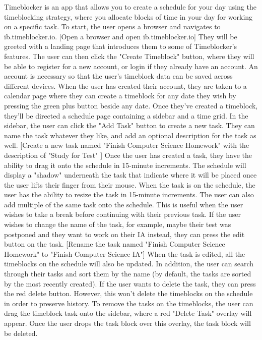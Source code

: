 \documentclass[notitlepage]{report}
\begin{document}
\obeylines
Timeblocker is an app that allows you to create a schedule for your day using the timeblocking strategy, where you allocate blocks of time in your day for working on a specific task.
To start, the user opens a browser and navigates to ib.timeblocker.io.
[Open a browser and open ib.timeblocker.io]
They will be greeted with a landing page that introduces them to some of Timeblocker's features.
The user can then click the "Create Timeblock" button, where they will be able to register for a new account, or login if they already have an account.
An account is necessary so that the user's timeblock data can be saved across different devices.
When the user has created their account, they are taken to a calendar page where they can create a timeblock for any date they wish by pressing the green plus button beside any date.
Once they've created a timeblock, they'll be directed a schedule page containing a sidebar and a time grid. In the sidebar, the user can click the "Add Task" button to create a new task. They can name the task whatever they like, and add an optional description for the task as well.
[Create a new task named "Finish Computer Science Homework" with the description of "Study for Test" ]
Once the user has created a task, they have the ability to drag it onto the schedule in 15-minute increments. The schedule will display a "shadow" underneath the task that indicate where it will be placed once the user lifts their finger from their mouse. When the task is on the schedule, the user has the ability to resize the task in 15-minute increments.
The user can also add multiple of the same task onto the schedule. This is useful when the user wishes to take a break before continuing with their previous task.
If the user wishes to change the name of the task, for example, maybe their test was postponed and they want to work on their IA instead, they can press the edit button on the task.
[Rename the task named "Finish Computer Science Homework" to "Finish Computer Science IA"]
When the task is edited, all the timeblocks on the schedule will also be updated.
In addition, the user can search through their tasks and sort them by the name (by default, the tasks are sorted by the most recently created).
If the user wants to delete the task, they can press the red delete button. However, this won't delete the timeblocks on the schedule in order to preserve history. To remove the tasks on the timeblocks, the user can drag the timeblock task onto the sidebar, where a red "Delete Task" overlay will appear. Once the user drops the task block over this overlay, the task block will be deleted.
\end{document}
